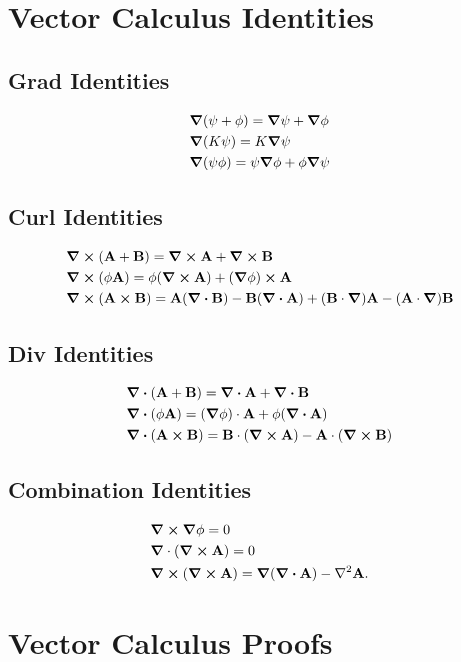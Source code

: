 \documentclass{book}
\begin{document}
\chapter{Vector Calculus Identities}
\section{Grad Identities}
\begin{align}
    & \grad(\psi + \phi) = \grad\psi + \grad\phi \\
    & \grad(K\psi) = K\grad\psi \\
    & \grad(\psi\phi) = \psi\grad\phi + \phi\grad\psi 
\end{align}
\section{Curl Identities}
\begin{align}
    & \curl{(\vb{A}+\vb{B})} = \curl{\vb{A}} + \curl{\vb{B}} \\
    & \curl{(\phi\vb{A})} = \phi(\curl{\vb{A}})+(\grad\phi)\cross\vb{A} \\
    & \curl{(\vb{A}\cross\vb{B})} = \vb{A}(\div{\vb{B}})-\vb{B}(\div{\vb{A}})+(\vb{B}\cdot\grad)\vb{A}-(\vb{A}\cdot\grad)\vb{B}
\end{align}
\section{Div Identities}
\begin{align}
    & \div{(\vb{A}+\vb{B})} = \div{\vb{A}} + \div{\vb{B}} \\
    & \div{(\phi\vb{A})} = (\grad\phi)\cdot\vb{A} +\phi(\div{\vb{A}}) \\
    & \div{(\vb{A}\cross\vb{B})} = \vb{B}\cdot(\curl{\vb{A}})-\vb{A}\cdot(\curl{\vb{B}})
\end{align}
\section{Combination Identities}
\begin{align}
    & \grad \cross \grad\phi = 0 \\
    & \grad \cdot (\curl{\vb{A}}) = 0 \\
    & \curl{(\curl{\vb{A}})} = \grad(\div{\vb{A}}) - \nabla^2\vb{A}.
\end{align}
\chapter{Vector Calculus Proofs}
\end{document}
